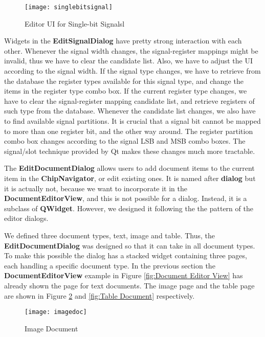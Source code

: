\begin{figure}[htb]
\centering
\texttt{[image: singlebitsignal]}
\caption{Editor UI for Single-bit Signalsl\label{fig:Editor UI for Single-bit Signals}}
\end{figure}

Widgets in the \textbf{EditSignalDialog} have pretty strong interaction with each other. Whenever the signal width changes, the signal-register mappings might be invalid, thus we have to clear the candidate list. Also, we have to adjust the UI according to the signal width. If the signal type changes, we have to retrieve from the database the register types available for this signal type, and change the items in the register type combo box. If the current register type changes, we have to clear the signal-register mapping candidate list, and retrieve registers of such type from the database. Whenever the candidate list changes, we also have to find available signal partitions. It is crucial that a signal bit cannot be mapped to more than one register bit, and the other way around. The register partition combo box changes according to the signal LSB and MSB combo boxes. The signal/slot technique provided by Qt makes these changes much more tractable.

The \textbf{EditDocumentDialog} allows users to add document items to the current item in the \textbf{ChipNavigator}, or edit existing ones. It is named after \textbf{dialog} but it is actually not, because we want to incorporate it in the \textbf{DocumentEditorView}, and this is not possible for a dialog. Instead, it is a subclass of \textbf{QWidget}. However, we designed it following the the pattern of the editor dialogs.

We defined three document types, text, image and table. Thus, the \textbf{EditDocumentDialog} was designed so that it can take in all document types. To make this possible the dialog has a stacked widget containing three pages, each handling a specific document type. In the previous section the \textbf{DocumentEditorView} example in Figure \ref{fig:Document Editor View} has already shown the page for text documents. The image page and the table page are shown in Figure \ref{fig:Image Document} and \ref{fig:Table Document} respectively.

\begin{figure}[htbp]
\centering
\texttt{[image: imagedoc]}
\caption{Image Document\label{fig:Image Document}}
\end{figure}

